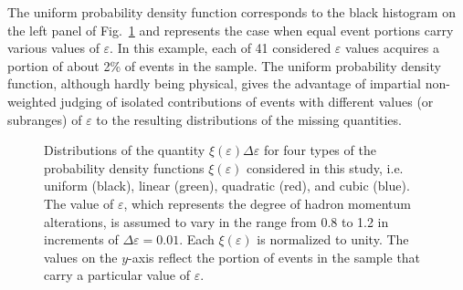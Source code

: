 The uniform probability density function corresponds to the black histogram on the left panel of Fig.~\ref{fig:density} and represents the case when equal event portions carry various values of $\varepsilon$. In this example, each of 41 considered $\varepsilon$ values acquires a portion of about 2\% of events in the sample. The uniform probability density function, although hardly being physical, gives the advantage of impartial non-weighted judging of isolated contributions of events with different values (or subranges) of $\varepsilon$ to the resulting distributions of the missing quantities.


\begin{figure}[htp]
\begin{center}
\caption{\small Distributions of the quantity $\xi(\varepsilon)\Delta\varepsilon$ for four types of the probability density functions $\xi(\varepsilon)$ considered in this study, i.e. uniform (black), linear (green), quadratic (red), and cubic (blue). The value of $\varepsilon$, which represents the degree of hadron momentum alterations, is assumed to vary in the range from 0.8 to 1.2 in increments of $\Delta\varepsilon=0.01$. Each  $\xi(\varepsilon)$ is normalized to unity. The values on the $y$-axis reflect the portion of events in the sample that carry a particular value of $\varepsilon$.  } \label{fig:density}
\end{center}
\end{figure}
